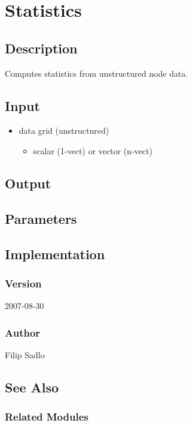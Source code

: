\section{Statistics}
\label{sec:statistics}


\subsection{Description}
Computes statistics from unstructured node data.
 

\subsection{Input}
\begin{itemize}
\item
  data grid (unstructured)
  \begin{itemize}
  \item
    scalar (1-vect) or vector (n-vect)
  \end{itemize}
\end{itemize}


\subsection{Output}


\subsection{Parameters}


\subsection{Implementation}


\subsubsection{Version}

2007-08-30


\subsubsection{Author}

Filip Sadlo


\subsection{See Also}


\subsubsection{Related Modules}

